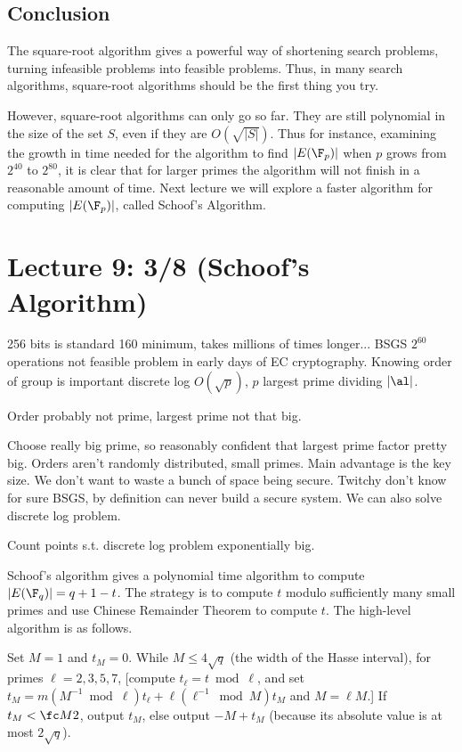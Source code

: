 \subsection{Conclusion}
The square-root algorithm gives a powerful way of shortening search problems, turning infeasible problems into feasible problems. Thus, in many search algorithms, square-root algorithms should be the first thing you try.

However, square-root algorithms can only go so far. They are still polynomial in the size of the set $S$, even if they are $O(\sqrt{|S|})$. Thus for instance, examining the growth in time needed for the algorithm to find $|E(\F_p)|$ when $p$ grows from  $2^{40}$ to $2^{80}$, it is clear that for larger primes the algorithm will not finish in a reasonable amount of time. Next lecture we will explore a faster algorithm for computing $|E(\F_p)|$, called Schoof's Algorithm.
\section{Lecture 9: 3/8 (Schoof's Algorithm)}
256 bits is standard
160 minimum, takes millions of times longer...
BSGS $2^{60}$ operations not feasible
problem in early days of EC cryptography.
Knowing order of group is important
discrete log $O(\sqrt p)$, $p$ largest prime dividing $|\al|$.

Order probably not prime, largest prime not that big.

Choose really big prime, so reasonably confident that largest prime factor pretty big. Orders aren't randomly distributed, small primes. Main advantage is the key size. We don't want to waste a bunch of space being secure.
Twitchy don't know for sure 
BSGS, by definition can never build a secure system. We can also solve discrete log problem. 

Count points s.t. discrete log problem exponentially big.

Schoof's algorithm gives a polynomial time algorithm to compute $|E(\F_q)|=q+1-t$. The strategy is to compute $t$ modulo sufficiently many small primes and use Chinese Remainder Theorem to compute $t$. The high-level algorithm is as follows.

Set $M=1$ and $t_M=0$. While $M\le 4\sqrt q$ (the width of the Hasse interval), for primes $\ell=2,3,5,7$, [compute $t_{\ell}=t\bmod{\ell}$, and set $t_M= m(M^{-1}\bmod{\ell})t_{\ell}+\ell(\ell^{-1}\bmod M)t_M$ and $M=\ell M$.]
If $t_M<\fc M2$, output $t_M$, else output $-M+t_M$ (because its absolute value is at most $2\sqrt q$).

